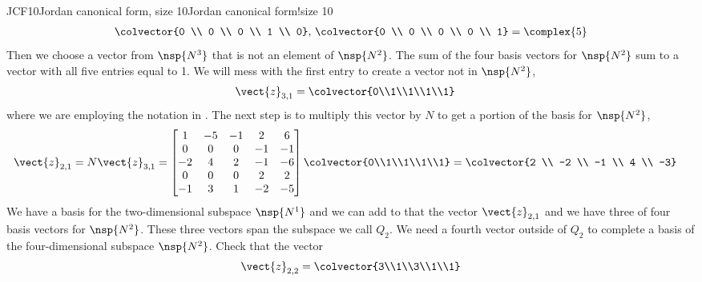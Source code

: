\begin{example}{JCF10}{Jordan canonical form, size 10}{Jordan canonical form!size 10}
\begin{align*}
{{\colvector{0 \\ 0 \\ 0 \\ 1 \\ 0},\,
\colvector{0 \\ 0 \\ 0 \\ 0 \\ 1}
}}
=\complex{5}
\end{align*}
%
Then we choose a vector from $\nsp{N^3}$ that is not an element of $\nsp{N^2}$.  The sum of the four basis vectors for $\nsp{N^2}$ sum to a vector with all five entries equal to 1.  We will mess with the first entry to create a vector not in $\nsp{N^2}$,
%
\begin{align*}
\vect{z}_{3,1}&=\colvector{0\\1\\1\\1\\1}
\end{align*}
%
where we are employing the notation in .  The next step is to multiply this vector by $N$ to get a portion of the basis for $\nsp{N^2}$,
%
\begin{align*}
\vect{z}_{2,1}&=
N\vect{z}_{3,1}=
\begin{bmatrix}
 1 & -5 & -1 & 2 & 6 \\
 0 & 0 & 0 & -1 & -1 \\
 -2 & 4 & 2 & -1 & -6 \\
 0 & 0 & 0 & 2 & 2 \\
 -1 & 3 & 1 & -2 & -5
\end{bmatrix}
\colvector{0\\1\\1\\1\\1}
=
\colvector{2 \\ -2 \\ -1 \\ 4 \\ -3}
\end{align*}
%
We have a basis for the two-dimensional subspace $\nsp{N^1}$ and we can add to that the vector $\vect{z}_{2,1}$ and we have three of four basis vectors for $\nsp{N^2}$.  These three vectors span the subspace we call $Q_2$.  We need a fourth vector outside of $Q_2$ to complete a basis of the four-dimensional subspace $\nsp{N^2}$.  Check that the vector
%
\begin{align*}
\vect{z}_{2,2}=\colvector{3\\1\\3\\1\\1}

\end{align*}
\end{example}
